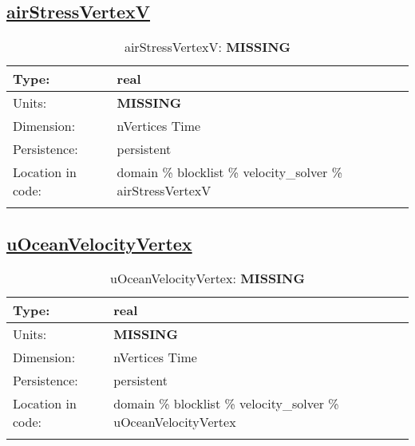 \subsection[airStressVertexV]{\hyperref[sec:var_tab_velocity_solver]{airStressVertexV}}
\label{subsec:var_sec_velocity_solver_airStressVertexV}
\begin{center}
\begin{longtable}{| p{2.0in} | p{4.0in} |}
        \hline 
        Type: & real \\
        \hline 
        Units: & {\bf \color{red} MISSING} \\
        \hline 
        Dimension: & nVertices Time \\
        \hline 
        Persistence: & persistent \\
        \hline 
         Location in code: & domain \% blocklist \% velocity\_solver \% airStressVertexV \\
         \hline 
    \caption{airStressVertexV: {\bf \color{red} MISSING}}
\end{longtable}
\end{center}
\subsection[uOceanVelocityVertex]{\hyperref[sec:var_tab_velocity_solver]{uOceanVelocityVertex}}
\label{subsec:var_sec_velocity_solver_uOceanVelocityVertex}
\begin{center}
\begin{longtable}{| p{2.0in} | p{4.0in} |}
        \hline 
        Type: & real \\
        \hline 
        Units: & {\bf \color{red} MISSING} \\
        \hline 
        Dimension: & nVertices Time \\
        \hline 
        Persistence: & persistent \\
        \hline 
         Location in code: & domain \% blocklist \% velocity\_solver \% uOceanVelocityVertex \\
         \hline 
    \caption{uOceanVelocityVertex: {\bf \color{red} MISSING}}
\end{longtable}
\end{center}
